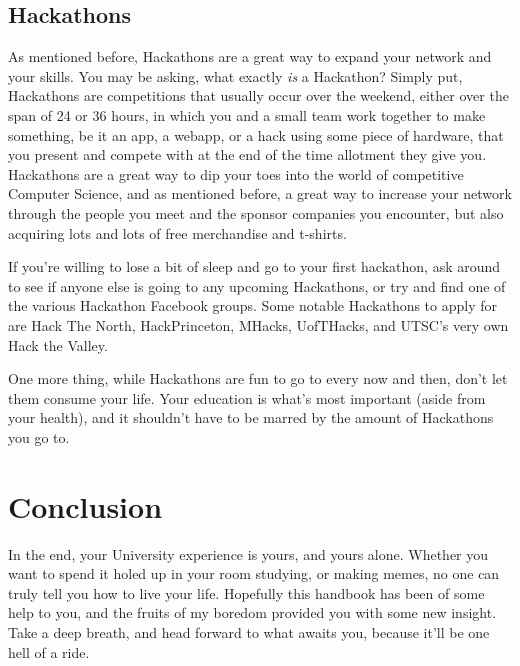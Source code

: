 \documentclass[11pt]{article}
\begin{document}
\subsection{Hackathons}
As mentioned before, Hackathons are a great way to expand your network and your skills.  You may be asking, what exactly \textit{is} a Hackathon?  Simply put, Hackathons are competitions that usually occur over the weekend, either over the span of 24 or 36 hours, in which you and a small team work together to make something, be it an app, a webapp, or a hack using some piece of hardware, that you present and compete with at the end of the time allotment they give you.  Hackathons are a great way to dip your toes into the world of competitive Computer Science, and as mentioned before, a great way to increase your network through the people you meet and the sponsor companies you encounter, but also acquiring lots and lots of free merchandise and t-shirts.\par
If you're willing to lose a bit of sleep and go to your first hackathon, ask around to see if anyone else is going to any upcoming Hackathons, or try and find one of the various Hackathon Facebook groups.  Some notable Hackathons to apply for are Hack The North, HackPrinceton, MHacks, UofTHacks, and UTSC's very own Hack the Valley.\par
One more thing, while Hackathons are fun to go to every now and then, don't let them consume your life.  Your education is what's most important (aside from your health), and it shouldn't have to be marred by the amount of Hackathons you go to.

\section{Conclusion}
In the end, your University experience is yours, and yours alone.  Whether you want to spend it holed up in your room studying, or making memes, no one can truly tell you how to live your life.  Hopefully this handbook has been of some help to you, and the fruits of my boredom provided you with some new insight.  Take a deep breath, and head forward to what awaits you, because it'll be one hell of a ride.
\end{document}

